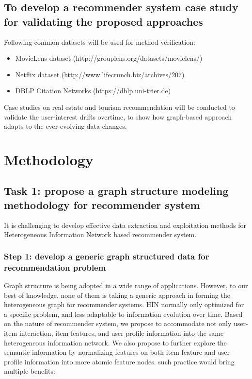 \documentclass[12pt,a4 paper,title page]{article}
\theoremstyle{definition}
\begin{document}
\subsection{To develop a recommender system case study for validating the proposed approaches}

Following common datasets will be used for method verification: 

\begin{itemize}

\item MovieLens dataset (http://grouplens.org/datasets/movielens/) 

\item Netflix dataset (http://www.lifecrunch.biz/archives/207) 

\item DBLP Citation Networks (https://dblp.uni-trier.de)  

\end{itemize}

Case studies on real estate and tourism recommendation will be conducted to validate the user-interest drifts overtime, to show how graph-based approach adapts to the ever-evolving data changes. 

\section{Methodology}

\subsection{Task 1: propose a graph structure modeling methodology for recommender system}
It is challenging to develop effective data extraction and exploitation methods for Heterogeneous Information Network based recommender system.

\subsubsection*{Step 1: develop a generic graph structured data for recommendation problem}

Graph structure is being adopted in a wide range of applications. However, to our best of knowledge, none of them is taking a generic approach in forming the heterogeneous graph for recommender systems. HIN normally only optimized for a specific problem, and less adaptable to information evolution over time. 
Based on the nature of recommender system, we propose to accommodate not only user-item interaction, item features, and user profile information into the same heterogeneous information network. We also propose to further explore the semantic information by normalizing features on both item feature and user profile information into more atomic feature nodes. such practice would bring multiple benefits: 
\end{document}

